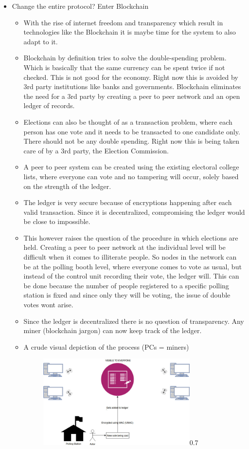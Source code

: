 \documentclass[a4paper,11pt]{article}
\begin{document}
\begin{itemize}
    \item Change the entire protocol? Enter Blockchain
    \begin{itemize}
        \item With the rise of internet freedom and transparency which result in technologies like the Blockchain it is maybe time for the system to also adapt to it. 
        \item Blockchain by definition tries to solve the double-spending problem. Which is basically that the same currency can be spent twice if not checked. This is not good for the economy. Right now this is avoided by 3rd party institutions like banks and governments. Blockchain eliminates the need for a 3rd party by creating a peer to peer network and an open ledger of records. 
        \item Elections can also be thought of as a transaction problem, where each person has one vote and it needs to be transacted to one candidate only. There should not be any double spending. Right now this is being taken care of by a 3rd party, the Election Commission. 
        \item A peer to peer system can be created using the existing electoral college lists, where everyone can vote and no tampering will occur, solely based on the strength of the ledger. 
        \item The ledger is very secure because of encryptions happening after each valid transaction. Since it is decentralized, compromising the ledger would be close to impossible. 
        \item This however raises the question of the procedure in which elections are held. Creating a peer to peer network at the individual level will be difficult when it comes to illiterate people. So nodes in the network can be at the polling booth level, where everyone comes to vote as usual, but instead of the control unit recording their vote, the ledger will. This can be done because the number of people registered to a specific polling station is fixed and since only they will be voting, the issue of double votes wont arise. 
        \item Since the ledger is decentralized there is no question of transparency. Any miner (blockchain jargon) can now keep track of the ledger. 
        \item A crude visual depiction of the process (PCs = miners)
        \begin{figure}[h!]
          \centering
          \begin{annotate}{\includegraphics[width=0.8\textwidth]{blockchain_election.jpg}}{0.7}

\end{annotate}
\end{figure}
\end{itemize}
\end{itemize}
\end{document}
